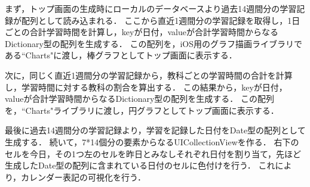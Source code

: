 まず，トップ画面の生成時にローカルのデータベースより過去14週間分の学習記録が配列として読み込まれる．
ここから直近1週間分の学習記録を取得し，1日ごとの合計学習時間を計算し，keyが日付，valueが合計学習時間からなるDictionary型の配列を生成する．
この配列を，iOS用のグラフ描画ライブラリである``Charts"に渡し，棒グラフとしてトップ画面に表示する．

次に，同じく直近1週間分の学習記録から，教科ごとの学習時間の合計を計算し，学習時間に対する教科の割合を算出する．
この結果から，keyが日付，valueが合計学習時間からなるDictionary型の配列を生成する．
この配列を，``Charts"ライブラリに渡し，円グラフとしてトップ画面に表示する．

最後に過去14週間分の学習記録より，学習を記録した日付をDate型の配列として生成する．
続いて，7*14個分の要素からなるUICollectionViewを作る．
右下のセルを今日，その1つ左のセルを昨日とみなしそれぞれ日付を割り当て，先ほど生成したDate型の配列に含まれている日付のセルに色付けを行う．
これにより，カレンダー表記の可視化を行う．

